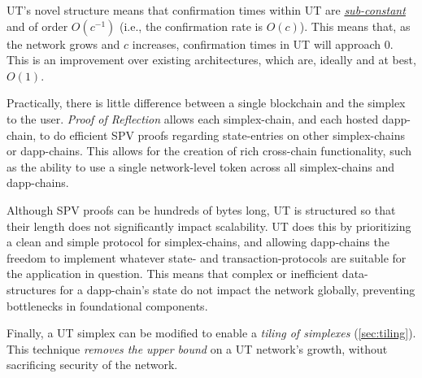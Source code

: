 UT's novel structure means that confirmation times within UT are \ul{\emph{sub-constant}} and of order $O(c^{-1})$ (i.e., the confirmation rate is $O(c)$).
This means that, as the network grows and $c$ increases, confirmation times in UT will approach 0.
This is an improvement over existing architectures, which are, ideally and at best, $O(1)$.

Practically, there is little difference between a single blockchain and the simplex to the user.
\emph{Proof of Reflection} allows each simplex-chain, and each hosted dapp-chain, to do efficient SPV proofs regarding state-entries on other simplex-chains or dapp-chains.
This allows for the creation of rich cross-chain functionality, such as the ability to use a single network-level token across all simplex-chains and dapp-chains.

Although SPV proofs can be hundreds of bytes long, UT is structured so that their length does not significantly impact scalability.
UT does this by prioritizing a clean and simple protocol for simplex-chains, and allowing dapp-chains the freedom to implement whatever state- and transaction-protocols are suitable for the application in question.
This means that complex or inefficient data-structures for a dapp-chain's state do not impact the network globally, preventing bottlenecks in foundational components.

Finally, a UT simplex can be modified to enable a \emph{tiling of simplexes} (\autoref{sec:tiling}).
This technique \emph{removes the upper bound} on a UT network's growth, without sacrificing security of the network.
